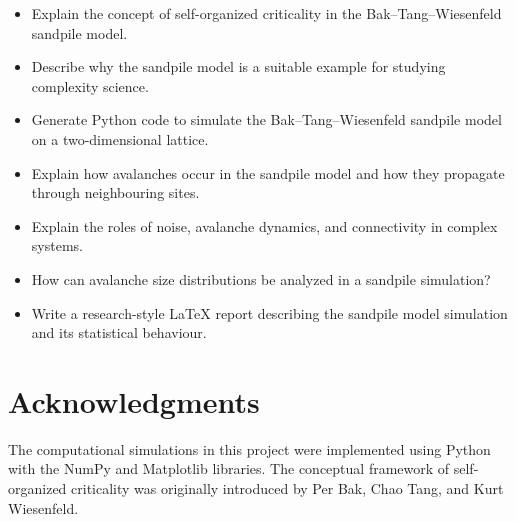 \documentclass[12pt]{article}
\begin{document}
\begin{itemize}

\item Explain the concept of self-organized criticality in the Bak–Tang–Wiesenfeld sandpile model.

\item Describe why the sandpile model is a suitable example for studying complexity science.

\item Generate Python code to simulate the Bak–Tang–Wiesenfeld sandpile model on a two-dimensional lattice.

\item Explain how avalanches occur in the sandpile model and how they propagate through neighbouring sites.

\item Explain the roles of noise, avalanche dynamics, and connectivity in complex systems.

\item How can avalanche size distributions be analyzed in a sandpile simulation?

\item Write a research-style LaTeX report describing the sandpile model simulation and its statistical behaviour.

\end{itemize}
\section{Acknowledgments}

The computational simulations in this project were implemented using Python with the NumPy and Matplotlib libraries. The conceptual framework of self-organized criticality was originally introduced by Per Bak, Chao Tang, and Kurt Wiesenfeld.
\end{document}
